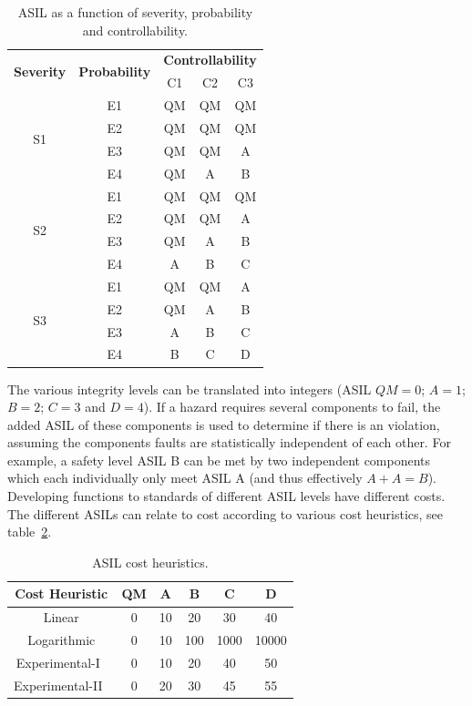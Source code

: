 \begin{table}[H]
\centering
\begin{tabular}{|c|c|c|c|c|}
\hline
\multirow{2}{*}{\textbf{Severity}} &\multirow{2}{*}{\textbf{Probability}} &\multicolumn{3}{|c|}{\textbf{Controllability}} \\ \cline{3-5}
 & &C1 &C2 &C3 \\ \hline
\multirow{4}{*}{S1} & E1 & QM & QM & QM \\ \cline{2-5}
 & E2 & QM & QM & QM \\ \cline{2-5}
 & E3 & QM & QM & A \\ \cline{2-5}
 & E4 & QM & A & B \\ \hline
\multirow{4}{*}{S2} & E1 & QM & QM & QM \\ \cline{2-5}
 & E2 & QM & QM & A \\ \cline{2-5}
 & E3 & QM & A & B \\ \cline{2-5}
 & E4 & A & B & C \\ \hline
\multirow{4}{*}{S3} & E1 & QM & QM & A \\ \cline{2-5}
 & E2 & QM & A & B \\ \cline{2-5}
 & E3 & A & B & C \\ \cline{2-5}
 & E4 & B & C & D \\ \hline
\end{tabular}
\caption{ASIL as a function of severity, probability and controllability.}
\label{table:ASIL}
\end{table}

The various integrity levels can be translated into integers (ASIL $QM = 0$; $A = 1$; $B = 2$; $C = 3$ and $D = 4$). If a hazard requires several components to fail, the added ASIL of these components is used to determine if there is an violation, assuming the components faults are statistically independent of each other. For example, a safety level ASIL B can be met by two independent components which each individually only meet ASIL A (and thus effectively $A + A = B$).~\cite{azevedo2014} \\ %

Developing functions to standards of different ASIL levels have different costs. The different ASILs can relate to cost according to various cost heuristics, see table~\ref{table:cost_heuritics}. %

\begin{table}[H]
\centering
\begin{tabular}{|c|c|c|c|c|c|}
\hline
\textbf{Cost Heuristic} & \textbf{QM} & \textbf{A} & \textbf{B} & \textbf{C} & \textbf{D} \\ \hline
Linear & 0 & 10 & 20 & 30 & 40 \\ \hline
Logarithmic & 0 & 10 & 100 & 1000 & 10000 \\ \hline
Experimental-I~\cite{azevedo2014} & 0 & 10 & 20 & 40 & 50 \\ \hline
Experimental-II~\cite{azevedo2014} & 0 & 20 & 30 & 45 & 55 \\ \hline
\end{tabular}
\caption{ASIL cost heuristics.}
\label{table:cost_heuritics}
\end{table}


